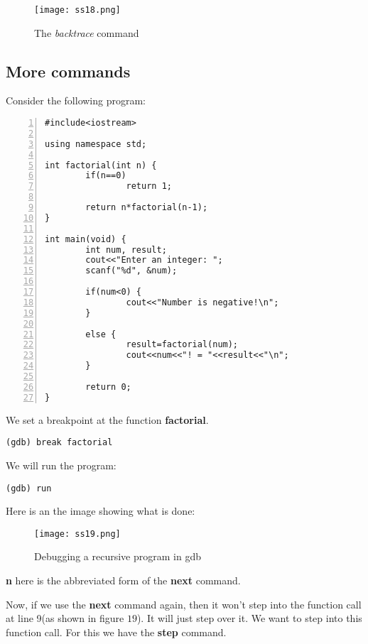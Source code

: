 \documentclass{article}
\makeatletter
\renewcommand\paragraph{\@startsection{paragraph}{4}{\z@}{-3.25ex \@plus -1ex \@minus -.2ex}{1.5ex \@plus .2ex}{\normalfont\normalsize\bfseries}}
\makeatother
\begin{document}
\begin{figure}[h]
\centering
\texttt{[image: ss18.png]}
\caption{The \textit{backtrace} command}
\end{figure}

\newpage
\subsection{More commands}
\paragraph{}
Consider the following program:
\begin{Verbatim}[numbers=left, frame=single]
#include<iostream>

using namespace std;

int factorial(int n) {
        if(n==0)
                return 1;

        return n*factorial(n-1);
}

int main(void) {
        int num, result;
        cout<<"Enter an integer: ";
        scanf("%d", &num);

        if(num<0) {
                cout<<"Number is negative!\n";
        }

        else {
                result=factorial(num);
                cout<<num<<"! = "<<result<<"\n";
        }

        return 0;
}
\end{Verbatim}

We set a breakpoint at the function \textbf{factorial}.
\begin{Verbatim}[frame=single]
(gdb) break factorial
\end{Verbatim}

We will run the program:
\begin{Verbatim}[frame=single]
(gdb) run
\end{Verbatim}

\newpage
Here is an the image showing what is done:
\begin{figure}[h]
\centering
\texttt{[image: ss19.png]}
\caption{Debugging a recursive program in gdb}
\end{figure}

\textbf{n} here is the abbreviated form of the \textbf{next} command.

Now, if we use the \textbf{next} command again, then it won't step into the function call at line 9(as shown in figure $19$). It will just step over it. We want to step into this function call. For this we have the \textbf{step} command.
\end{document}
